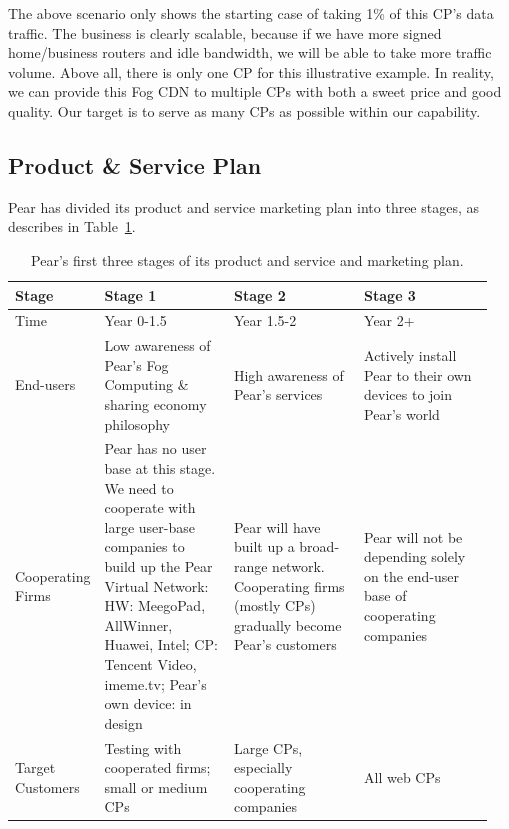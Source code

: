 The above scenario only shows the starting case of taking 1\% of this CP's data traffic. The business is clearly scalable, because if we have more signed home/business routers and idle bandwidth, we will be able to take more traffic volume. Above all, there is only one CP for this illustrative example. In reality, we can provide this Fog CDN to multiple CPs with both a sweet price and good quality. Our target is to serve as many CPs as possible within our capability. 

\subsection{Product \& Service Plan}
Pear has divided its product and service marketing plan into three stages, as describes in Table~\ref{tb:product-market-plan}. 
\begin{table}[htb]
	\centering
	\caption{Pear's first three stages of its product and service and marketing plan.}\label{tb:product-market-plan}
	\footnotesize
	\begin{tabular}{p{0.11\linewidth}p{0.28\linewidth}p{0.28\linewidth}p{0.28\linewidth}}  
		\toprule
		Stage &    Stage 1    & Stage 2 & Stage 3 \\
		\midrule 
		Time & Year 0-1.5 & Year 1.5-2 & Year 2+ \\
		End-users & Low awareness of Pear's Fog Computing \& sharing economy philosophy & High awareness of Pear's services & Actively install Pear to their own devices to join Pear's world\\
		Cooperating Firms & {Pear has no user base at this stage. We need to cooperate with large user-base companies to build up the Pear Virtual Network: HW: MeegoPad, AllWinner, Huawei, Intel; CP: Tencent Video, imeme.tv; Pear's own device: in design} & {Pear will have built up a broad-range network. Cooperating firms (mostly CPs) gradually become Pear's customers} & {Pear will not be depending solely on the end-user base of cooperating companies}\\
		Target Customers & {Testing with cooperated firms; small or medium CPs} & {Large CPs, especially cooperating companies} &    All web CPs\\    
		\bottomrule
	\end{tabular}
\end{table}


